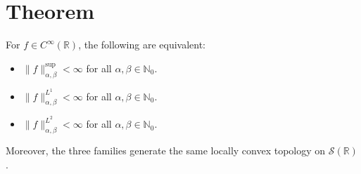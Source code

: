 \documentclass{techbrief}
\begin{document}
	\section{Theorem}
	
	\begin{thrm}
		For $f \in C^\infty(\mathbb{R})$, the following are equivalent:
		\begin{itemize}
			\item[\textup{(i)}] $\|f\|_{\alpha,\beta}^{\sup} < \infty$ for all $\alpha, \beta \in \mathbb{N}_0$.
			\item[\textup{(ii)}] $\|f\|_{\alpha,\beta}^{L^1} < \infty$ for all $\alpha, \beta \in \mathbb{N}_0$.
			\item[\textup{(iii)}] $\|f\|_{\alpha,\beta}^{L^2} < \infty$ for all $\alpha, \beta \in \mathbb{N}_0$.
		\end{itemize}
		Moreover, the three families generate the same locally convex topology on $\mathcal{S}(\mathbb{R})$.
	\end{thrm}
	
\end{document}
